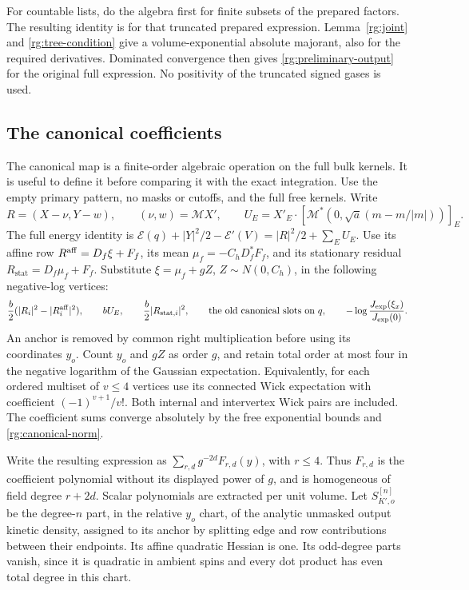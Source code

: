 For countable lists, do the algebra first for finite subsets of the
prepared factors.  The resulting identity is for that truncated
prepared expression.  Lemma~\ref{rg:joint} and
\eqref{rg:tree-condition} give a volume-exponential absolute
majorant, also for the required derivatives.  Dominated convergence
then gives \eqref{rg:preliminary-output} for the original full
expression.  No positivity of the truncated signed gases is used.

\subsection{The canonical coefficients}
\label{rg:canonical}

The canonical map is a finite-order algebraic operation on the full
bulk kernels.  It is useful to define it before comparing it with
the exact integration.  Use the empty primary pattern, no masks or
cutoffs, and the full free kernels.  Write
\[
 R=(X-\nu,Y-w),\qquad(\nu,w)=\mathcal M X',\qquad
 U_E=X'_E\cdot[\mathcal M^*(0,\sqrt a(m-m/|m|))]_E.
\]
The full energy identity is
$\mathcal E(q)+|Y|^2/2-\mathcal E'(V)=|R|^2/2+\sum_EU_E$.
Use its affine row $R^{\rm aff}=D_f\xi+F_f$, its mean
$\mu_f=-C_hD_f^*F_f$, and its stationary residual
$R_{\mathrm{stat}}=D_f\mu_f+F_f$.  Substitute $\xi=\mu_f+gZ$,
$Z\sim N(0,C_h)$, in the following negative-log vertices:
\begin{equation}
 \frac b2(|R_i|^2-|R_i^{\rm aff}|^2),\qquad
 bU_E,\qquad\frac b2|R_{\mathrm{stat},i}|^2,\qquad
 \text{the old canonical slots on }q,\qquad
 -\log\frac{J_{\exp}(\xi_x)}{J_{\exp}(0)}.
 \label{rg:canonical-vertices}
\end{equation}
An anchor is removed by common right multiplication before using
its coordinates $y_o$.  Count $y_o$ and $gZ$ as order $g$, and
retain total order at most four in the negative logarithm of the
Gaussian expectation.  Equivalently, for each ordered multiset of
$v\le4$ vertices use its connected Wick expectation with coefficient
$(-1)^{v+1}/v!$.  Both internal and intervertex Wick pairs are included.
The coefficient sums converge absolutely by the free exponential
bounds and \eqref{rg:canonical-norm}.

Write the resulting expression as
$\sum_{r,d}g^{-2d}F_{r,d}(y)$, with $r\le4$.
Thus $F_{r,d}$ is the coefficient polynomial without its displayed
power of $g$, and is homogeneous of field degree $r+2d$.
Scalar polynomials are extracted per unit volume.  Let
$S_{K',o}^{[n]}$ be the degree-$n$ part, in the relative $y_o$ chart,
of the analytic unmasked output kinetic density, assigned to its
anchor by splitting edge and row contributions between their
endpoints.  Its affine quadratic Hessian is one.  Its odd-degree
parts vanish, since it is quadratic in ambient spins and every dot
product has even total degree in this chart.

